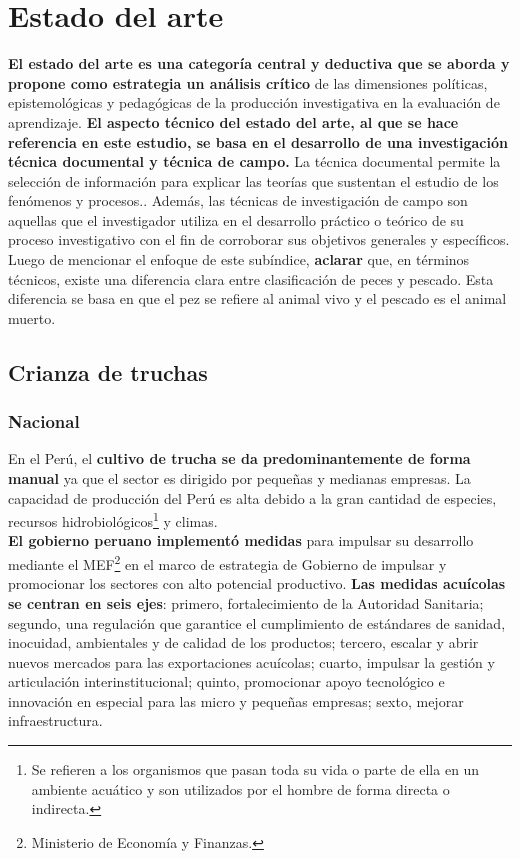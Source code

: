 \section{Estado del arte}
\textbf{El estado del arte es una categoría central y deductiva que se aborda y propone como estrategia un análisis crítico} de las dimensiones políticas, epistemológicas y pedagógicas de la producción investigativa en la evaluación de aprendizaje.\cite{GuevaraPatino2016} \textbf{El aspecto técnico del estado del arte, al que se hace referencia en este estudio, se basa en el desarrollo de una investigación técnica documental y técnica de campo.} La técnica documental permite la selección de información para explicar las teorías que sustentan el estudio de los fenómenos y procesos.. \cite{Martinez2003} Además, las técnicas de investigación de campo son aquellas que el investigador utiliza en el desarrollo práctico o teórico de su proceso investigativo con el fin de corroborar sus objetivos generales y específicos. \cite{GuevaraPatino2016}\\

Luego de mencionar el enfoque de este subíndice, \textbf{aclarar} que, en términos técnicos, existe una diferencia clara entre clasificación de peces y pescado. Esta diferencia se basa en que el pez se refiere al animal vivo y el pescado es el animal muerto. \\

\subsection{Crianza de truchas}

\subsubsection{Nacional}
En el Perú, el \textbf{cultivo de trucha se da predominantemente de forma manual} ya que el sector es dirigido por pequeñas y medianas empresas. La capacidad de producción del Perú es alta debido a la gran cantidad de especies, recursos hidrobiológicos\footnote{Se refieren a los organismos que pasan toda su vida o parte de ella en un ambiente acuático y son utilizados por el hombre de forma directa o indirecta.\cite{MINAGRI2011}} y climas. \\

\textbf{El gobierno peruano implementó medidas} para impulsar su desarrollo mediante el MEF\footnote{Ministerio de Economía y Finanzas.}  en el marco de estrategia de Gobierno de impulsar y promocionar los sectores con alto potencial productivo. \textbf{Las medidas acuícolas se centran en seis ejes}: primero, fortalecimiento de la Autoridad Sanitaria; segundo, una regulación que garantice el cumplimiento de estándares de sanidad, inocuidad, ambientales y de calidad de los productos; tercero, escalar y abrir nuevos mercados para las exportaciones acuícolas; cuarto, impulsar la gestión y articulación interinstitucional; quinto, promocionar apoyo tecnológico e innovación en especial para las micro y pequeñas empresas; sexto, mejorar infraestructura. \cite{Andina2019}\\

